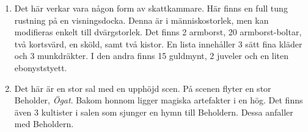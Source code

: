 \begin{enumerate}
	\item Det här verkar vara någon form av skattkammare. Här finns en full tung rustning på en visningsdocka. Denna är i människostorlek, men kan modifieras enkelt till dvärgstorlek. Det finns 2 armborst, 20 armborst-boltar, två kortsvärd, en sköld, samt två kistor. En lista innehåller 3 sätt fina kläder och 3 munkdräkter. I den andra finns 15 guldmynt, 2 juveler och en liten ebonyststyett. 
	\item Det här är en stor sal med en upphöjd scen. På scenen flyter en stor Beholder, \textit{Ögat}. Bakom honnom ligger magiska artefakter i en hög. Det finns även 3 kultister i salen som sjunger en hymn till Beholdern. Dessa anfaller med Beholdern.
	
\end{enumerate}
